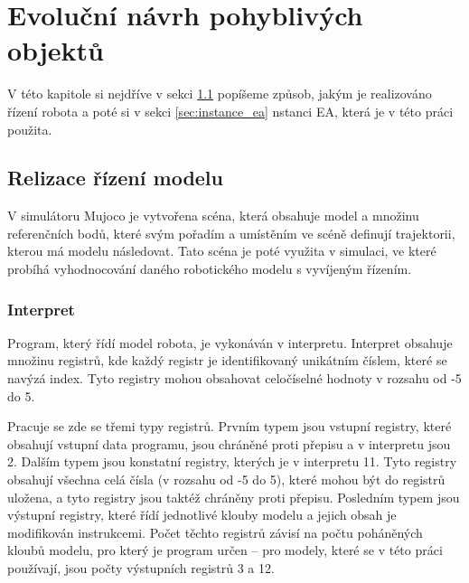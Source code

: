 
\chapter{Evoluční návrh pohyblivých objektů}
V této kapitole si nejdříve v sekci \ref{sec:realizace_rizeni_modelu} popíšeme způsob, jakým je realizováno řízení robota a poté si v sekci \ref{sec:instance_ea} nstanci EA, která je v této práci použita.


\section{Relizace řízení modelu}
\label{sec:realizace_rizeni_modelu}

V simulátoru Mujoco je vytvořena scéna, která obsahuje model a množinu referenčních bodů, které svým pořadím a umístěním ve scéně definují trajektorii, kterou má modelu následovat. Tato scéna je poté využita v simulaci, ve které probíhá vyhodnocování daného robotického modelu s vyvíjeným řízením.

\subsection{Interpret}

Program, který řídí model robota, je vykonáván v interpretu.
Interpret obsahuje množinu registrů, kde každý registr je identifikovaný unikátním číslem, které se navýzá index.
Tyto registry mohou obsahovat celočíselné hodnoty v rozsahu od -5 do 5.

Pracuje se zde se třemi typy registrů.
Prvním typem jsou vstupní registry, které obsahují vstupní data programu, jsou chráněné proti přepisu a v interpretu jsou 2.
Dalším typem jsou konstatní registry, kterých je v interpretu 11.
Tyto registry obsahují všechna celá čísla (v rozsahu od -5 do 5), které mohou být do registrů uložena, a tyto registry jsou taktéž chráněny proti přepisu.
Posledním typem jsou výstupní registry, které řídí jednotlivé klouby modelu a jejich obsah je modifikován instrukcemi.
Počet těchto registrů závisí na počtu poháněných kloubů modelu, pro který je program určen -- pro modely, které se v této práci používají, jsou počty výstupních registrů 3 a 12.


